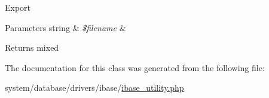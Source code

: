 Export


\begin{DoxyParams}[1]{Parameters}
string & {\em \$filename} & \\
\hline
\end{DoxyParams}
\begin{DoxyReturn}{Returns}
mixed 
\end{DoxyReturn}


The documentation for this class was generated from the following file\+:\begin{DoxyCompactItemize}
\item 
system/database/drivers/ibase/\mbox{\hyperlink{ibase__utility_8php}{ibase\+\_\+utility.\+php}}\end{DoxyCompactItemize}
